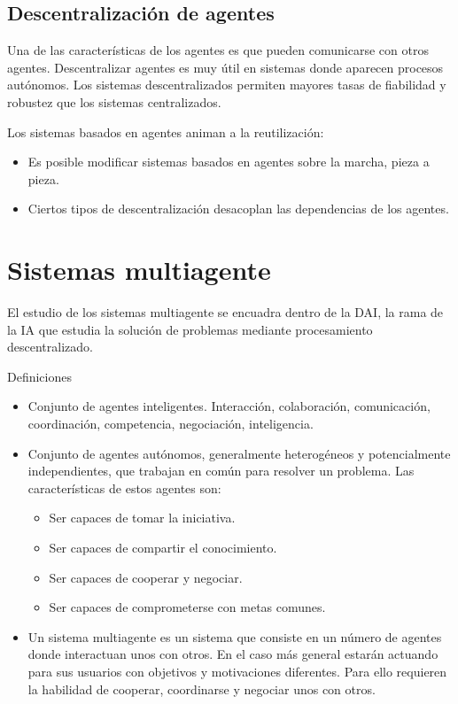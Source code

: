 \subsection{Descentralización de agentes}

Una de las características de los agentes es que pueden comunicarse con otros agentes. Descentralizar agentes es muy útil en sistemas donde aparecen procesos autónomos. Los sistemas descentralizados permiten mayores tasas de fiabilidad y robustez que los sistemas centralizados.

Los sistemas basados en agentes animan a la reutilización:

\begin{itemize}
	\item Es posible modificar sistemas basados en agentes sobre la marcha, pieza a pieza.
	\item Ciertos tipos de descentralización desacoplan las dependencias de los agentes.
\end{itemize}

\section{Sistemas multiagente}

El estudio de los sistemas multiagente se encuadra dentro de la DAI, la rama de la IA que estudia la solución de problemas mediante procesamiento descentralizado.

Definiciones

\begin{itemize}
	\item Conjunto de agentes inteligentes. Interacción, colaboración, comunicación, coordinación, competencia, negociación, inteligencia.
	\item Conjunto de agentes autónomos, generalmente heterogéneos y potencialmente independientes, que trabajan en común para resolver un problema. Las características de estos agentes son:
	\begin{itemize}
		\item Ser capaces de tomar la iniciativa.
		\item Ser capaces de compartir el conocimiento.
		\item Ser capaces de cooperar y negociar.
		\item Ser capaces de comprometerse con metas comunes.
	\end{itemize}
	\item Un sistema multiagente es un sistema que consiste en un número de agentes donde interactuan unos con otros. En el caso más general estarán actuando para sus usuarios con objetivos y motivaciones diferentes. Para ello requieren la habilidad de cooperar, coordinarse y negociar unos con otros.
\end{itemize}

